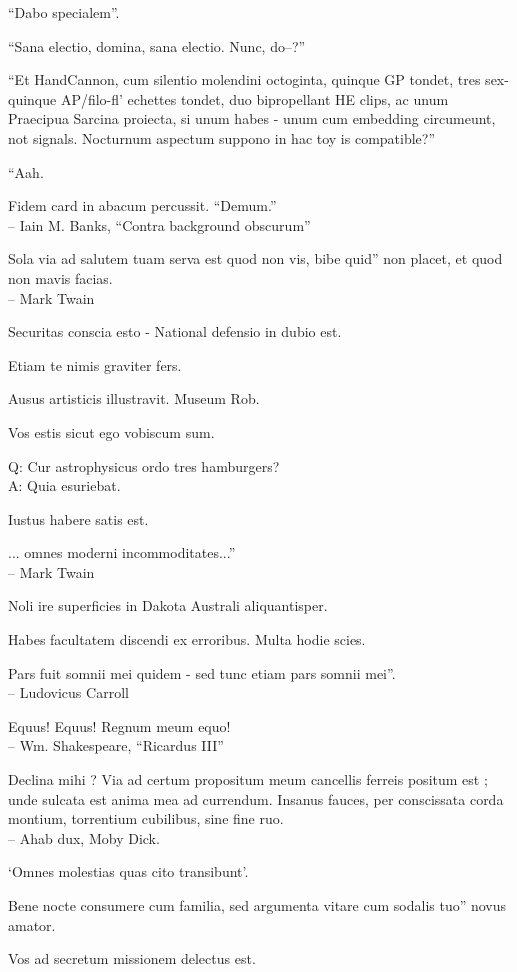 \documentclass[titlepage,12pt]{memoir}
\begin{document}
“Dabo specialem”.

“Sana electio, domina, sana electio. Nunc, do--?”

“Et HandCannon, cum silentio molendini octoginta, quinque GP tondet, tres
sex-quinque AP/filo-fl’ echettes tondet, duo bipropellant HE clips, ac unum
Praecipua Sarcina proiecta, si unum habes - unum cum embedding
circumeunt, not signals. Nocturnum aspectum suppono in hac toy is
compatible?”

“Aah.

Fidem card in abacum percussit. “Demum.”
\\-- Iain M. Banks, “Contra background obscurum”

Sola via ad salutem tuam serva est quod non vis, bibe quid”
non placet, et quod non mavis facias.
\\-- Mark Twain

Securitas conscia esto - National defensio in dubio est.

Etiam te nimis graviter fers.

Ausus artisticis illustravit. Museum Rob.

Vos estis sicut ego vobiscum sum.

Q: Cur astrophysicus ordo tres hamburgers?\\
A: Quia esuriebat.

Iustus habere satis est.

... omnes moderni incommoditates...”
\\-- Mark Twain

Noli ire superficies in Dakota Australi aliquantisper.

Habes facultatem discendi ex erroribus. Multa hodie scies.

Pars fuit somnii mei quidem - sed tunc etiam pars somnii mei”.
\\-- Ludovicus Carroll

Equus! Equus! Regnum meum equo!
\\-- Wm. Shakespeare, “Ricardus III”

 Declina mihi ? Via ad certum propositum meum cancellis ferreis positum est ;
unde sulcata est anima mea ad currendum. Insanus fauces, per
conscissata corda montium, torrentium cubilibus, sine fine ruo.
\\-- Ahab dux, Moby Dick.

‘Omnes molestias quas cito transibunt’.

Bene nocte consumere cum familia, sed argumenta vitare cum sodalis tuo”
novus amator.

Vos ad secretum missionem delectus est.
\end{document}
